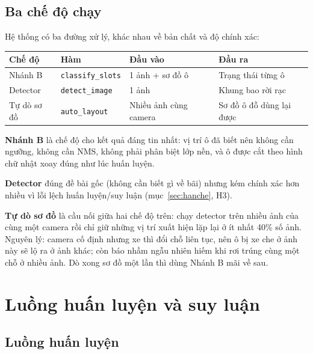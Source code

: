 \documentclass[12pt]{ai_conquer2026}
\begin{document}
\subsection{Ba chế độ chạy}

Hệ thống có ba đường xử lý, khác nhau về bản chất và độ chính xác:

\begin{center}
\begin{tabular}{|l|l|l|l|}
\hline
\textbf{Chế độ} & \textbf{Hàm} & \textbf{Đầu vào} & \textbf{Đầu ra} \\
\hline
Nhánh B & \texttt{classify\_slots} & 1 ảnh + sơ đồ ô & Trạng thái từng ô \\
\hline
Detector & \texttt{detect\_image} & 1 ảnh & Khung bao rời rạc \\
\hline
Tự dò sơ đồ & \texttt{auto\_layout} & Nhiều ảnh cùng camera & Sơ đồ ô đỗ dùng lại được \\
\hline
\end{tabular}
\end{center}

\textbf{Nhánh B} là chế độ cho kết quả đáng tin nhất: vị trí ô đã biết nên không cần ngưỡng, không cần NMS, không phải phân biệt lớp nền, và ô được cắt theo hình chữ nhật xoay đúng như lúc huấn luyện.

\textbf{Detector} đúng đề bài gốc (không cần biết gì về bãi) nhưng kém chính xác hơn nhiều vì lỗi lệch huấn luyện/suy luận (mục~\ref{sec:hanche}, H3).

\textbf{Tự dò sơ đồ} là cầu nối giữa hai chế độ trên: chạy detector trên nhiều ảnh của cùng một camera rồi chỉ giữ những vị trí xuất hiện lặp lại ở ít nhất 40\% số ảnh. Nguyên lý: camera cố định nhưng xe thì đổi chỗ liên tục, nên ô bị xe che ở ảnh này sẽ lộ ra ở ảnh khác; còn báo nhầm ngẫu nhiên hiếm khi rơi trúng cùng một chỗ ở nhiều ảnh. Dò xong sơ đồ một lần thì dùng Nhánh B mãi về sau.

\newpage
\section{Luồng huấn luyện và suy luận}

\subsection{Luồng huấn luyện}
\end{document}
